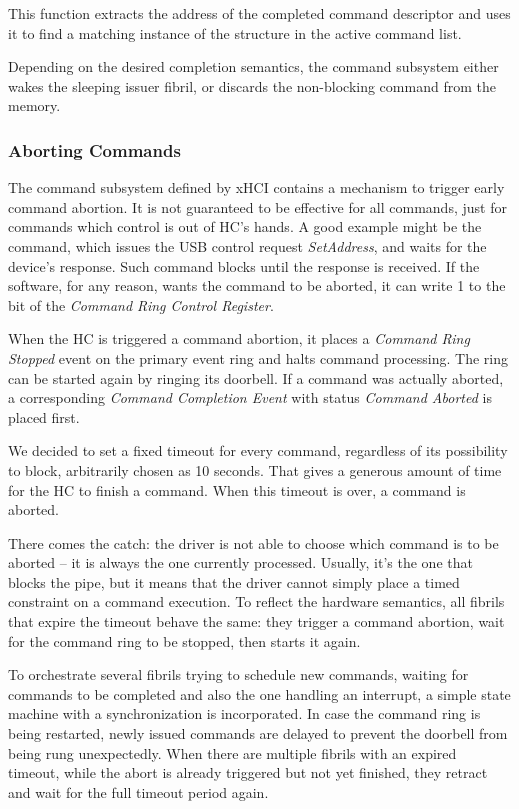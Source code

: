 This function extracts the address of the completed command descriptor and uses
it to find a matching instance of the  structure in the
active command list.

Depending on the desired completion semantics, the command subsystem either
wakes the sleeping issuer fibril, or discards the non-blocking command from the
memory.


\subsubsection{Aborting Commands}

The command subsystem defined by xHCI contains a mechanism to trigger early
command abortion. It is not guaranteed to be effective for all commands, just
for commands which control is out of HC's hands. A good example might be the
 command, which issues the USB control request
\emph{SetAddress}, and waits for the device's response. Such command blocks
until the response is received. If the software, for any reason, wants the
command to be aborted, it can write 1 to the  bit of the
\emph{Command Ring Control Register}.

When the HC is triggered a command abortion, it places a \emph{Command Ring
Stopped} event on the primary event ring and halts command processing. The ring
can be started again by ringing its doorbell. If a command was actually
aborted, a corresponding \emph{Command Completion Event} with status
\emph{Command Aborted} is placed first.

We decided to set a fixed timeout for every command, regardless of its
possibility to block, arbitrarily chosen as 10 seconds. That gives a generous
amount of time for the HC to finish a command. When this timeout is over,
a command is aborted.

There comes the catch: the driver is not able to choose which command is to be
aborted -- it is always the one currently processed. Usually, it's the one that
blocks the pipe, but it means that the driver cannot simply place a timed
constraint on a command execution. To reflect the hardware semantics, all
fibrils that expire the timeout behave the same: they trigger a command
abortion, wait for the command ring to be stopped, then starts it again.

To orchestrate several fibrils trying to schedule new commands, waiting for
commands to be completed and also the one handling an interrupt, a simple state
machine with a synchronization is incorporated. In case the command ring is
being restarted, newly issued commands are delayed to prevent the doorbell from
being rung unexpectedly. When there are multiple fibrils with an expired timeout,
while the abort is already triggered but not yet finished, they retract and
wait for the full timeout period again.


